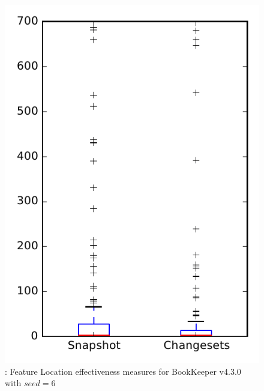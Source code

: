 
\begin{figure}
\centering
\includegraphics[height=0.4\textheight]{figures/flt_seed/rq1_bookkeeper_6}
\caption{\rone: Feature Location effectiveness measures for BookKeeper v4.3.0 with $seed=6$}
\label{fig:flt_seed:rq1:bookkeeper}
\end{figure}
